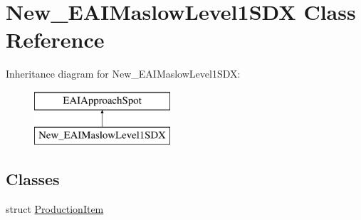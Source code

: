 \hypertarget{class_new___e_a_i_maslow_level1_s_d_x}{}\section{New\+\_\+\+E\+A\+I\+Maslow\+Level1\+S\+DX Class Reference}
\label{class_new___e_a_i_maslow_level1_s_d_x}
Inheritance diagram for New\+\_\+\+E\+A\+I\+Maslow\+Level1\+S\+DX\+:\begin{figure}[H]
\begin{center}
\leavevmode
\includegraphics[height=2.000000cm]{class_new___e_a_i_maslow_level1_s_d_x}
\end{center}
\end{figure}
\subsection*{Classes}
\begin{DoxyCompactItemize}
\item 
struct \mbox{\hyperlink{struct_new___e_a_i_maslow_level1_s_d_x_1_1_production_item}{Production\+Item}}
\end{DoxyCompactItemize}
